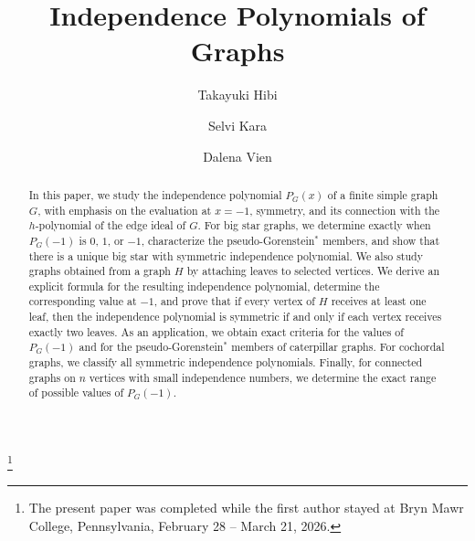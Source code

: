 \documentclass[12pt]{amsart}
\theoremstyle{plain}
\theoremstyle{definition}
\begin{document}
\title{Independence Polynomials of Graphs}

\author[Hibi]{Takayuki Hibi}
\address[T.~Hibi]{Department of Pure and Applied Mathematics, Graduate School of Information Science and Technology, Osaka University, Suita, Osaka 565--0871, Japan}

\author[Kara]{Selvi Kara}
\address[S.~Kara]{Department of Mathematics, Bryn Mawr College, Bryn Mawr, PA 19010}

\author[Vien]{Dalena Vien}
\address[D.~Vien]{Department of Mathematics, Bryn Mawr College, Bryn Mawr, PA 19010}


	

    	   	
	\thanks{The present paper was completed while the first author stayed at Bryn Mawr College, Pennsylvania, February 28 -- March 21, 2026. } 

\begin{abstract}
In this paper, we study the independence polynomial \(P_G(x)\) of a finite simple graph \(G\), with emphasis on the evaluation at \(x=-1\), symmetry, and its connection with the \(h\)-polynomial of the edge ideal of $G$. For big star graphs, we determine exactly when \(P_G(-1)\) is \(0\), \(1\), or \(-1\), characterize the pseudo-Gorenstein\(^*\) members, and show that there is a unique big star with symmetric independence polynomial. We also study graphs obtained from a graph \(H\) by attaching leaves to selected vertices. We derive an explicit formula for the resulting independence polynomial, determine the corresponding value at \(-1\), and prove that if every vertex of \(H\) receives at least one leaf, then the independence polynomial is symmetric if and only if each vertex receives exactly two leaves. As an application, we obtain exact criteria for the values of \(P_G(-1)\) and for the pseudo-Gorenstein\(^*\) members of caterpillar graphs. For cochordal graphs, we classify all symmetric independence polynomials. Finally, for connected  graphs on $n$ vertices with small independence numbers, we determine the exact range of possible values of \(P_G(-1)\).
\end{abstract}
\end{document}
